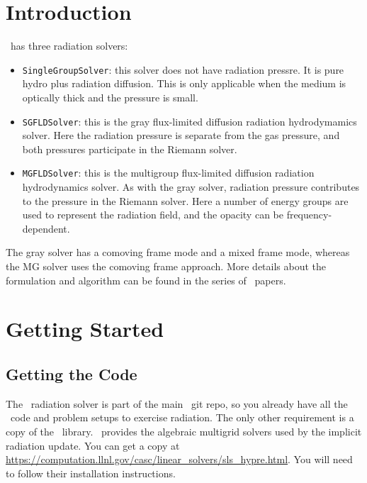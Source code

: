 \section{Introduction}

\castro\ has three radiation solvers: 
\begin{itemize}
\item {\tt SingleGroupSolver}: this solver does not have radiation
  pressre.  It is pure hydro plus radiation diffusion.  This is only
  applicable when the medium is optically thick and the pressure is small.

\item {\tt SGFLDSolver}: this is the gray flux-limited diffusion
  radiation hydrodymamics solver.  Here the radiation pressure is
  separate from the gas pressure, and both pressures participate in
  the Riemann solver.

\item {\tt MGFLDSolver}: this is the multigroup flux-limited diffusion
  radiation hydrodynamics solver.  As with the gray solver, radiation
  pressure contributes to the pressure in the Riemann solver.  Here a
  number of energy groups are used to represent the radiation field,
  and the opacity can be frequency-dependent.

\end{itemize}

The gray solver has a comoving frame mode and a mixed frame mode,
whereas the MG solver uses the comoving frame approach.  More details
about the formulation and algorithm can be found in the series of
\castro\ papers.

\section{Getting Started}

\subsection{Getting the Code}

The \castro\ radiation solver is part of the main \castro\ git repo,
so you already have all the \castro\ code and problem setups
to exercise radiation.  The only other requirement is a copy
of the \hypre\ library. \hypre\ provides the algebraic multigrid
solvers used by the implicit radiation update.  You can get
a copy at \url{https://computation.llnl.gov/casc/linear_solvers/sls_hypre.html}.  You will need to follow their installation instructions.

